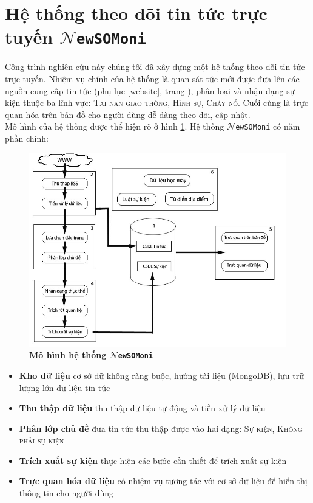 \section{Hệ thống theo dõi tin tức trực tuyến  $\mathcal{N}$\texttt{ewSOMoni}}
\label{system}
\noindent Công trình nghiên cứu này chúng tôi đã xây dựng một hệ thống theo dõi tin tức trực tuyến. Nhiệm vụ chính của hệ thống là quan sát tức mới được đưa lên các nguồn cung cấp tin tức (phụ lục \ref{website}, trang \pageref{website}), phân loại và nhận dạng  sự kiện thuộc ba lĩnh vực: \textsc{Tai nạn giao thông}, \textsc{Hình sự}, \textsc{Cháy nổ}. Cuối cùng là trực quan hóa trên bản đồ cho người dùng dễ dàng theo dõi, cập nhật. \\
\noindent Mô hình của hệ thống được thể hiện rõ ở hình \ref{fig:system}. Hệ thống $\mathcal{N}$\texttt{ewSOMoni} có năm  phần chính:
\begin{figure}[htbp]
		\centering
		\includegraphics[width=1\textwidth]{system}
		\caption{\textbf{Mô hình hệ thống  $\mathcal{N}$\texttt{ewSOMoni}}}
		\label{fig:system}
\end{figure}

\begin{itemize}
  \item \textbf{Kho dữ liệu} cơ sở dữ không ràng buộc, hướng tài liệu (MongoDB), lưu trữ lượng  lớn dữ liệu tin tức

\item \textbf{Thu thập dữ liệu} thu thập dữ liệu tự động và tiền xử lý dữ liệu
  \item \textbf{Phân lớp chủ đề} đưa  tin tức thu thập được vào hai  dạng: \textsc{Sự kiện}, \textsc{Không phải sự kiện}



  \item \textbf{Trích xuất sự kiện} thực hiện các bước cần thiết để trích xuất sự kiện
  \item \textbf{Trực quan hóa dữ liệu} có nhiệm vụ tương tác với cơ sở dữ liệu để hiển thị thông tin cho người dùng
 \end{itemize}

